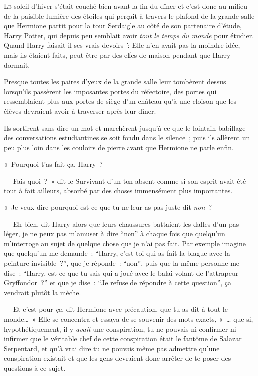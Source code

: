 
\lettrine{L}{e} soleil d'hiver s'était couché bien avant la fin du dîner et c'est donc au milieu de la paisible lumière des étoiles qui perçait à travers le plafond de la grande salle que Hermione partit pour la tour Serdaigle au côté de son partenaire d'étude, Harry Potter, qui depuis peu semblait avoir \emph{tout le temps du monde} pour étudier. Quand Harry faisait-il ses vrais devoirs~? Elle n'en avait pas la moindre idée, mais ils étaient faits, peut-être par des elfes de maison pendant que Harry dormait.

Presque toutes les paires d'yeux de la grande salle leur tombèrent dessus lorsqu'ils passèrent les imposantes portes du réfectoire, des portes qui ressemblaient plus aux portes de siège d'un château qu'à une cloison que les élèves devraient avoir à traverser après leur dîner.

Ils sortirent sans dire un mot et marchèrent jusqu'à ce que le lointain babillage des conversations estudiantines se soit fondu dans le silence~; puis ils allèrent un peu plus loin dans les couloirs de pierre avant que Hermione ne parle enfin.

«~Pourquoi t'as fait ça, Harry~?

--- Fais quoi~?~» dit le Survivant d'un ton absent comme si son esprit avait été tout à fait ailleurs, absorbé par des choses immensément plus importantes.

«~Je veux dire pourquoi est-ce que tu ne leur as pas juste dit \emph{non}~?

--- Eh bien, dit Harry alors que leurs chaussures battaient les dalles d'un pas léger, je ne peux pas m'amuser à dire “non” à chaque fois que quelqu'un m'interroge au sujet de quelque chose que je n'ai pas fait. Par exemple imagine que quelqu'un me demande~: “Harry, c'est toi qui as fait la blague avec la peinture invisible~?”, que je réponde~: “non”, puis que la même personne me dise~: “Harry, est-ce que tu sais qui a joué avec le balai volant de l'attrapeur Gryffondor~?” et que je dise~: “Je refuse de répondre à cette question”, ça vendrait plutôt la mèche.

--- Et c'est pour \emph{ça}, dit Hermione avec précaution, que tu as dit à tout le monde…~» Elle se concentra et essaya de se souvenir des mots exacts, «~… que si, hypothétiquement, il y \emph{avait} une conspiration, tu ne pouvais ni confirmer ni infirmer que le véritable chef de cette conspiration était le fantôme de Salazar Serpentard, et qu'à vrai dire tu ne pouvais même pas admettre qu'une conspiration existait et que les gens devraient donc arrêter de te poser des questions à ce sujet.

